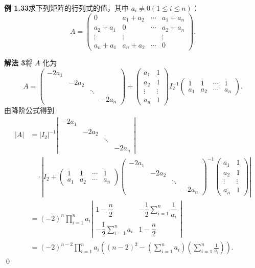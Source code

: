 \documentclass[UTF8, 12pt, fontset=fandol, oneside]{ctexart}
\begin{document}
\noindent\textbf{例 1.33}\quad 求下列矩阵的行列式的值，其中 $a_i\ne0(1\le i\le n)$：
\[
A=
\left(
\begin{array}{cccc}
0 & a_1+a_2 & \cdots & a_1+a_n\\
a_2+a_1 & 0 & \cdots & a_2+a_n\\
\vdots & \vdots & & \vdots\\
a_n+a_1 & a_n+a_2 & \cdots & 0
\end{array}
\right).
\]

\noindent\textbf{解法 3}\quad 将 $A$ 化为
\[
A=
\left(
\begin{array}{cccc}
-2a_1 & & &\\
& -2a_2 & &\\
& & \ddots &\\
& & & -2a_n
\end{array}
\right)
+
\left(
\begin{array}{cc}
a_1 & 1\\
a_2 & 1\\
\vdots & \vdots\\
a_n & 1
\end{array}
\right)
I_2^{-1}
\left(
\begin{array}{cccc}
1 & 1 & \cdots & 1\\
a_1 & a_2 & \cdots & a_n
\end{array}
\right).
\]
由降阶公式得到
\[
\begin{aligned}
|A|
&=|I_2|^{-1}
\left|
\begin{array}{cccc}
-2a_1 & & &\\
& -2a_2 & &\\
& & \ddots &\\
& & & -2a_n
\end{array}
\right|\\
&\quad\cdot
\left|
I_2+
\left(
\begin{array}{cccc}
1 & 1 & \cdots & 1\\
a_1 & a_2 & \cdots & a_n
\end{array}
\right)
\left(
\begin{array}{cccc}
-2a_1 & & &\\
& -2a_2 & &\\
& & \ddots &\\
& & & -2a_n
\end{array}
\right)^{-1}
\left(
\begin{array}{cc}
a_1 & 1\\
a_2 & 1\\
\vdots & \vdots\\
a_n & 1
\end{array}
\right)
\right|\\
&=(-2)^n\prod_{i=1}^n a_i
\left|
\begin{array}{cc}
1-\dfrac n2 & -\dfrac12\sum\limits_{i=1}^n\dfrac1{a_i}\\
-\dfrac12\sum\limits_{i=1}^n a_i & 1-\dfrac n2
\end{array}
\right|\\
&=(-2)^{n-2}\prod_{i=1}^n a_i
\left((n-2)^2-\left(\sum_{i=1}^n a_i\right)
\left(\sum_{i=1}^n\frac1{a_i}\right)\right).
\end{aligned}
\]
\qed
\end{document}
